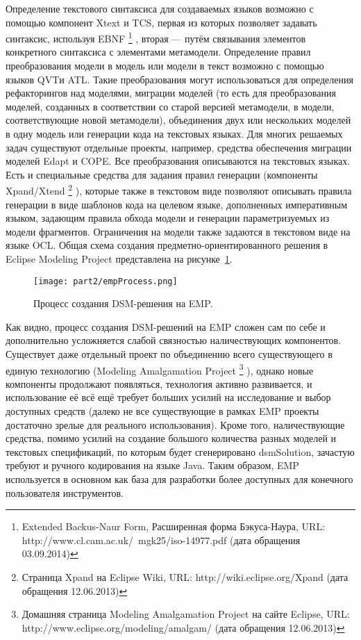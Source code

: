 Определение текстового синтаксиса для создаваемых языков возможно с помощью компонент 
Xtext и TCS, первая из которых позволяет задавать синтаксис, используя EBNF%
\footnote{Extended Backus-Naur Form, Расширенная форма Бэкуса-Наура, URL: http://www.cl.cam.ac.uk/~mgk25/iso-14977.pdf (дата обращения 03.09.2014)}%
, вторая --- путём связывания элементов конкретного синтаксиса с элементами метамодели. Определение 
правил преобразования модели в модель или модели в текст возможно с помощью языков 
QVTи ATL. Такие преобразования могут использоваться для определения рефакторингов 
над моделями, миграции моделей (то есть для преобразования моделей, созданных в соответствии 
со старой версией метамодели, в модели, соответствующие новой метамодели), объединения 
двух или нескольких моделей в одну модель или генерации кода на текстовых языках. 
Для многих решаемых задач существуют отдельные проекты, например, средства обеспечения
миграции моделей Edapt и COPE.
Все преобразования описываются на текстовых языках. Есть и специальные средства для задания правил генерации (компоненты Xpand/Xtend%
\footnote{Страница Xpand на Eclipse Wiki, URL: http://wiki.eclipse.org/Xpand (дата обращения 12.06.2013)}%
), которые также в текстовом виде позволяют описывать правила генерации в виде шаблонов кода на целевом языке, дополненных 
императивным языком, задающим правила обхода модели и генерации параметризуемых из модели 
фрагментов. Ограничения на модели также задаются в текстовом виде на языке OCL. Общая 
схема создания предметно-ориентированного решения в Eclipse Modeling Project представлена на рисунке~\ref{empProcess}.

\begin{figure} [ht]
	\begin{center}
		\texttt{[image: part2/empProcess.png]}
		\caption{Процесс создания DSM-решения на EMP.}
		\label{empProcess}
	\end{center}
\end{figure}

Как видно, процесс создания \ac{DSM}-решений на EMP сложен сам по себе и дополнительно 
усложняется слабой связностью наличествующих компонентов. Существует даже отдельный 
проект по объединению всего существующего в единую технологию (Modeling Amalgamation Project%
\footnote{Домашняя страница Modeling Amalgamation Project на сайте Eclipse, URL:  http://www.eclipse.org/modeling/amalgam/ (дата обращения 12.06.2013)}%
), однако новые компоненты продолжают появляться, технология активно развивается, и использование 
её всё ещё требует больших усилий на исследование и выбор доступных средств (далеко 
не все существующие в рамках EMP проекты достаточно зрелые для реального использования). 
Кроме того, наличествующие средства, помимо усилий на создание большого количества 
разных моделей и текстовых спецификаций, по которым будет сгенерировано \ac{dsmSolution}, 
зачастую требуют и ручного кодирования на языке Java. Таким образом, EMP используется 
в основном как база для разработки более доступных для конечного пользователя инструментов.

